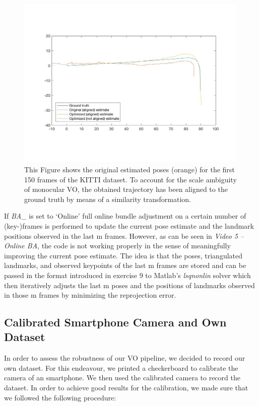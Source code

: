 \begin{figure}
\includegraphics[width=0.99\textwidth]{files/aligned_optimized.jpg}
\caption[\label{f:aligned_optimized}Offline Bundle Adjustment]{This Figure shows the original estimated poses (orange) for the first 150 frames of the KITTI dataset. To account for the scale ambiguity of monocular VO, the obtained trajectory has been aligned to the ground truth by means of a similarity transformation.}
\end{figure}

If \textit{BA\_} is set to ‘Online’ full online bundle adjustment on a certain number of (key-)frames is performed to update the current pose estimate and the landmark positions observed in the last m frames. However, as can be seen in \textit{Video 5 – Online BA}, the code is not working properly in the sense of meaningfully improving the current pose estimate. The idea is that the poses, triangulated landmarks, and observed keypoints of the last m frames are stored and can be passed in the format introduced in exercise 9 to Matlab’s \textit{lsqnonlin} solver which then iteratively adjusts the last m poses and the positions of landmarks observed in those m frames by minimizing the reprojection error.  



\subsection{Calibrated Smartphone Camera and Own Dataset}

In order to assess the robustness of our VO pipeline, we decided to record our own dataset.
For this endeavour, we printed a checkerboard to calibrate the camera of an smartphone.
We then used the calibrated camera to record the dataset.
In order to achieve good results for the calibration, we made sure that we followed the following procedure:

